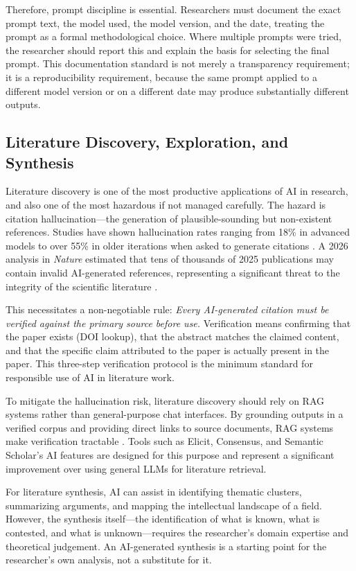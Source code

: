 \documentclass[12pt, a4paper]{article}
\begin{document}
Therefore, prompt discipline is essential. Researchers must document the exact prompt text, the model used, the model version, and the date, treating the prompt as a formal methodological choice. Where multiple prompts were tried, the researcher should report this and explain the basis for selecting the final prompt. This documentation standard is not merely a transparency requirement; it is a reproducibility requirement, because the same prompt applied to a different model version or on a different date may produce substantially different outputs.

\subsection{Literature Discovery, Exploration, and Synthesis}

Literature discovery is one of the most productive applications of AI in research, and also one of the most hazardous if not managed carefully. The hazard is citation hallucination---the generation of plausible-sounding but non-existent references. Studies have shown hallucination rates ranging from 18\% in advanced models to over 55\% in older iterations when asked to generate citations \citep{walters2023fabrication}. A 2026 analysis in \textit{Nature} estimated that tens of thousands of 2025 publications may contain invalid AI-generated references, representing a significant threat to the integrity of the scientific literature \citep{nature2026hallucination}.

This necessitates a non-negotiable rule: \textit{Every AI-generated citation must be verified against the primary source before use.} Verification means confirming that the paper exists (DOI lookup), that the abstract matches the claimed content, and that the specific claim attributed to the paper is actually present in the paper. This three-step verification protocol is the minimum standard for responsible use of AI in literature work.

To mitigate the hallucination risk, literature discovery should rely on RAG systems rather than general-purpose chat interfaces. By grounding outputs in a verified corpus and providing direct links to source documents, RAG systems make verification tractable \citep{li2025enhancing}. Tools such as Elicit, Consensus, and Semantic Scholar's AI features are designed for this purpose and represent a significant improvement over using general LLMs for literature retrieval.

For literature synthesis, AI can assist in identifying thematic clusters, summarizing arguments, and mapping the intellectual landscape of a field. However, the synthesis itself---the identification of what is known, what is contested, and what is unknown---requires the researcher's domain expertise and theoretical judgement. An AI-generated synthesis is a starting point for the researcher's own analysis, not a substitute for it.
\end{document}
